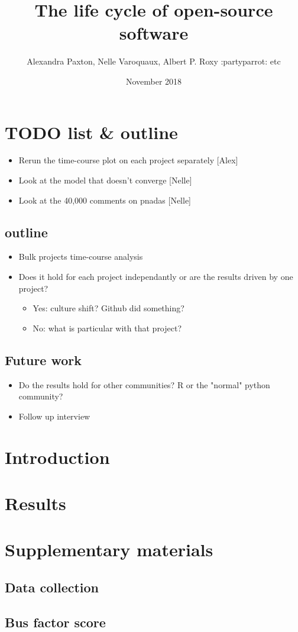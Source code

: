 \documentclass{article}
\title{The life cycle of open-source software}
\author{Alexandra Paxton, Nelle Varoquaux, Albert P. Roxy :partyparrot: etc}
\date{November 2018}
\begin{document}
\maketitle

\begin{abstract}

\end{abstract}

\section{TODO list \& outline}

\begin{itemize}
\item Rerun the time-course plot on each project separately [Alex]
\item Look at the model that doesn't converge [Nelle]
\item Look at the 40,000 comments on pnadas [Nelle]
\end{itemize}

\subsection{outline}
\begin{itemize}
\item Bulk projects time-course analysis
\item Does it hold for each project independantly or are the results driven by
one project?
\begin{itemize}
\item  Yes: culture shift? Github did something?
\item No: what is particular with that project?
\end{itemize}
\end{itemize}

\subsection{Future work}

\begin{itemize}
\item Do the results hold for other communities? R or the "normal" python
community?
\item Follow up interview
\end{itemize}




\section{Introduction}

\section{Results}

\section{Supplementary materials}
\subsection{Data collection}

\subsection{Bus factor score}
\end{document}
